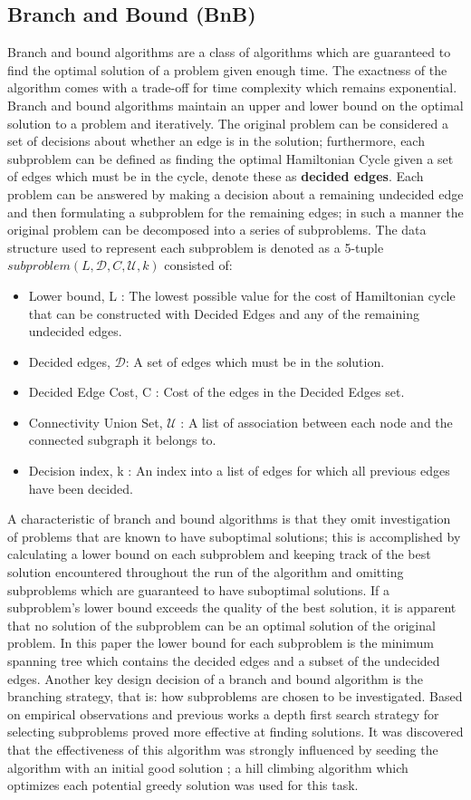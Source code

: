 \documentclass[format=sigconf]{acmart}
\begin{document}
\subsection{Branch and Bound (BnB)}
Branch and bound algorithms are a class of algorithms which are guaranteed to find the optimal solution of a problem given enough time. The exactness of the algorithm comes with a trade-off for time complexity which remains exponential. Branch and bound algorithms maintain an upper and lower bound on the optimal solution to a problem and iteratively. The original problem can be considered a set of decisions about whether an edge is in the solution; furthermore, each subproblem can be defined as finding the optimal Hamiltonian Cycle given a set of edges which must be in the cycle, denote these as \textbf{decided edges}. Each problem can be answered by making a decision about a remaining undecided edge and then formulating a subproblem for the remaining edges; in such a manner the original problem can be decomposed into a series of subproblems. The data structure used to represent each subproblem is denoted as a 5-tuple $subproblem(L,\mathcal{D}, C, \mathcal{U}, k)$ consisted of:
\begin{itemize}
	\item  Lower bound, L : The lowest possible value for the cost of Hamiltonian cycle that can be constructed with Decided Edges and any of the remaining undecided edges.
	\item  Decided edges, $\mathcal{D}$: A set of edges which must be in the solution.
	\item  Decided Edge Cost, C : Cost of the edges in the Decided Edges set.
	\item  Connectivity Union Set, $\mathcal{U}$ : A list of association between each node and the connected subgraph it belongs to.
	\item  Decision index, k : An index into a list of edges for which all previous edges have been decided.
\end{itemize}
 A characteristic of branch and bound algorithms is that they omit investigation of problems that are known to have suboptimal solutions; this is accomplished by calculating a lower bound on each subproblem and keeping track of the best solution encountered throughout the run of the algorithm and omitting subproblems which are guaranteed to have suboptimal solutions. If a subproblem's lower bound exceeds the quality of the best solution, it is apparent that no solution  of the subproblem can be an optimal solution of the original problem. In this paper the lower bound for each subproblem is the minimum spanning tree which contains the decided edges and a subset of the undecided edges. Another key design decision of a branch and bound algorithm is the branching strategy, that is: how subproblems are chosen to be investigated. Based on empirical observations and previous works \cite{bnb-principles} a depth first search strategy for selecting subproblems proved more effective at finding solutions. It was discovered that the effectiveness of this algorithm was strongly influenced by seeding the algorithm with an initial good solution \cite{bnb-principles}; a hill climbing algorithm which optimizes each potential greedy solution was used for this task.
\end{document}

